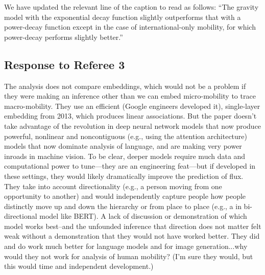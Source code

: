 \documentclass[12pt,a4paper]{article}
\newcommand{\response}[1]{{\noindent #1}}
\newcommand{\rcomment}[1]{%
\vspace{10pt}
\begin{tcolorbox}[colback=black!3,colframe=white!45!black, left=0pt, right=0pt, top=0pt, bottom=0pt, arc=0pt,outer arc=0pt, grow to left by=-0.5cm,grow to right by=-0.5cm]
#1
\end{tcolorbox}
}
\begin{document}
\response{We have updated the relevant line of the caption to read as follows: 
“The gravity model with the exponential decay function slightly outperforms that with a power-decay function except in the case of international-only mobility, for which power-decay performs slightly better.”
}

\subsection{Response to Referee 3}

\rcomment{The analysis does not compare embeddings, which would not be a problem if they were making
an inference other than we can embed micro-mobility to trace macro-mobility. They use an
efficient (Google engineers developed it), single-layer embedding from 2013, which produces
linear associations. But the paper doesn’t take advantage of the revolution in deep neural
network models that now produce powerful, nonlinear and noncontiguous (e.g., using the
attention architecture) models that now dominate analysis of language, and are making very
power inroads in machine vision. To be clear, deeper models require much data and computational power to tune—they are an engineering feat—but if developed in these settings, they would likely dramatically improve the prediction of flux. They take into account directionality (e.g., a person moving from one opportunity to another) and would independently capture people how people distinctly move up and down the hierarchy or from place to place (e.g., a in bi-directional model like BERT). A lack of discussion or demonstration of which model works best--and the unfounded inference that direction does not matter felt weak without a demonstration that they would not have worked better. They did and do work much better for language models and for image generation...why would they not work for analysis of human mobility? (I’m sure they would, but this would time and independent development.)
}
\end{document}
